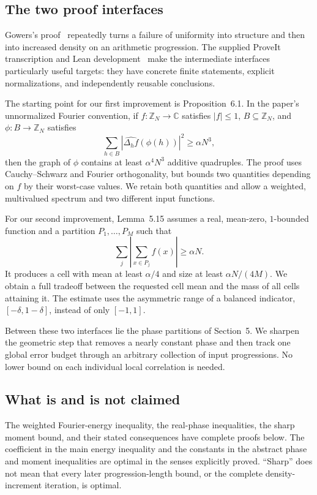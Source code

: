 \documentclass[11pt,letterpaper]{article}
\numberwithin{equation}{section}
\theoremstyle{definition}
\theoremstyle{remark}
\newcommand{\Z}{\mathbb Z}
\newcommand{\C}{\mathbb C}
\newcommand{\1}{\mathbf 1}
\begin{document}
\subsection{The two proof interfaces}
Gowers's proof~\cite{gowers} repeatedly turns a failure of uniformity into structure and then into increased density on an arithmetic progression. The supplied ProveIt transcription and Lean development~\cite{repo02} make the intermediate interfaces particularly useful targets: they have concrete finite statements, explicit normalizations, and independently reusable conclusions.

The starting point for our first improvement is Proposition~6.1. In the paper's unnormalized Fourier convention, if $f:\Z_N\to\C$ satisfies $|f|\leq1$, $B\subseteq\Z_N$, and $\phi:B\to\Z_N$ satisfies
\begin{equation}\label{gsr:fm:02:eq:old61}
 \sum_{h\in B}|\widehat{\Delta_h f}(\phi(h))|^2\geq\alpha N^3,
\end{equation}
then the graph of $\phi$ contains at least $\alpha^4N^3$ additive quadruples. The proof uses Cauchy--Schwarz and Fourier orthogonality, but bounds two quantities depending on $f$ by their worst-case values. We retain both quantities and allow a weighted, multivalued spectrum and two different input functions.

For our second improvement, Lemma~5.15 assumes a real, mean-zero, $1$-bounded function and a partition $P_1,\ldots,P_M$ such that
\[
 \sum_j\left|\sum_{x\in P_j}f(x)\right|\geq\alpha N.
\]
It produces a cell with mean at least $\alpha/4$ and size at least $\alpha N/(4M)$. We obtain a full tradeoff between the requested cell mean and the mass of all cells attaining it. The estimate uses the asymmetric range of a balanced indicator, $[-\delta,1-\delta]$, instead of only $[-1,1]$.

Between these two interfaces lie the phase partitions of Section~5. We sharpen the geometric step that removes a nearly constant phase and then track one global error budget through an arbitrary collection of input progressions. No lower bound on each individual local correlation is needed.

\subsection{What is and is not claimed}
The weighted Fourier-energy inequality, the real-phase inequalities, the sharp moment bound, and their stated consequences have complete proofs below. The coefficient in the main energy inequality and the constants in the abstract phase and moment inequalities are optimal in the senses explicitly proved. ``Sharp'' does not mean that every later progression-length bound, or the complete density-increment iteration, is optimal.
\end{document}
